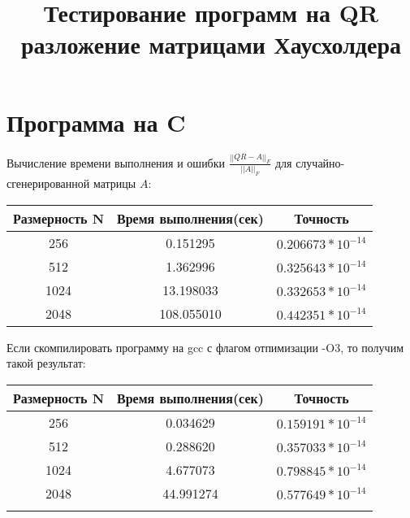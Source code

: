 \documentclass[10pt]{article}
\title{Тестирование программ на QR разложение матрицами Хаусхолдера}
\author{}
\date{}
\begin{document}
\maketitle

\section{Программа на C}
Вычисление времени выполнения и ошибки $\frac{||QR - A||_F}{||A||_F}$ для случайно-сгенерированной матрицы $A$:
\begin{center}
    \begin{tabular}{c|c|c}
      Размерность N & Время выполнения(сек)& Точность \\
      \hline 
      256 & 0.151295 & $0.206673 * 10^{-14}$ \\
      \hline
      512 & 1.362996 & $0.325643 * 10^{-14}$ \\
      \hline
      1024 & 13.198033 & $0.332653 * 10^{-14}$ \\
      \hline
      2048 & 108.055010 & $0.442351 * 10^{-14}$ \\
    \end{tabular}
\end{center}

Если скомпилировать программу на gcc с флагом отпимизации -O3, то получим такой результат:
\begin{center}
    \begin{tabular}{c|c|c}
      Размерность N & Время выполнения(сек) & Точность \\
      \hline
      256 & 0.034629 & $0.159191 * 10^{-14}$ \\
      \hline
      512 &  0.288620 & $0.357033 * 10^{-14}$ \\
      \hline
      1024 & 4.677073 & $0.798845 * 10^{-14}$ \\
      \hline
      2048 & 44.991274 & $0.577649 * 10^{-14}$ \\
      \\
    \end{tabular}
\end{center}
\end{document}
